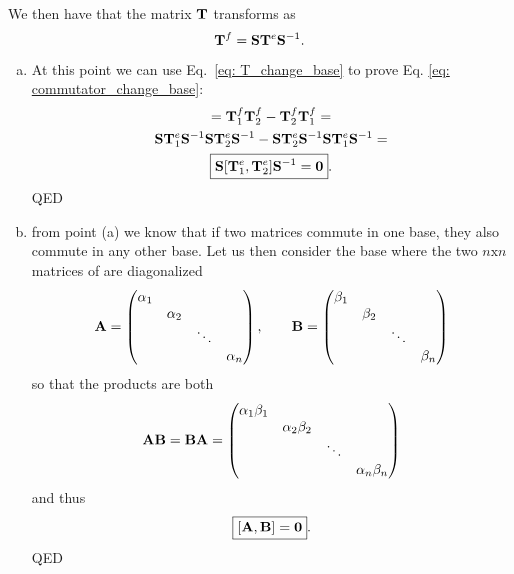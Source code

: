 We then have that the matrix $\mathbf{T}$ transforms as 
\begin{equation}
    \label{eq: T_change_base}
    \mathbf{T}^f = \mathbf{S} \mathbf{T}^e \mathbf{S}^{-1}.
\end{equation}
\begin{enumerate}[(a)]
    \item At this point we can use Eq.~\eqref{eq: T_change_base} to prove Eq. \eqref{eq: commutator_change_base}:
    \begin{gather}
        [ \mb{T}_1^f, \mb{T}_2^f ] = \mb{T}_1^f \mb{T}_2^f - \mb{T}_2^f \mb{T}_1^f = \notag \\
        \mb{S} \mb{T}_1^e \mb{S}^{-1} \mb{S} \mb{T}_2^e \mb{S}^{-1} - \mb{S} \mb{T}_2^e \mb{S}^{-1} \mb{S} \mb{T}_1^e \mb{S}^{-1} = \notag \\
        \mybox{\mb{S} [ \mb{T}_1^e, \mb{T}_2^e] \mb{S}^{-1} = \mb{0}}.
    \end{gather}
    QED
    \item from point (a) we know that if two matrices commute in one base, they also commute in any other base. Let us then consider the base where the two $n \text{x} n$ matrices of are diagonalized
    \begin{equation}
        \mathbf{A} = 
        \begin{pmatrix}
            \alpha_1 &  &  &  \\
             & \alpha_2 &  &  \\
             & & \ddots & \\
             &  &  & \alpha_n
        \end{pmatrix},
        \qquad
        \mathbf{B} = 
        \begin{pmatrix}
            \beta_1 &  &  &  \\
             & \beta_2 &  &  \\
             & & \ddots & \\
             &  &  & \beta_n
        \end{pmatrix}
    \end{equation}
    so that the products are both
    \begin{equation}
        \mathbf{AB} = \mathbf{BA} =
        \begin{pmatrix}
            \alpha_1 \beta_1 &  &  &  \\
             & \alpha_2 \beta_2 &  &  \\
             & & \ddots & \\
             &  &  & \alpha_n \beta_n
        \end{pmatrix} 
    \end{equation}
    and thus 
    \begin{equation}
        \boxed{[ \mathbf{A}, \mathbf{B} ] = \mathbf{0}}.
    \end{equation}
    QED
\end{enumerate}




